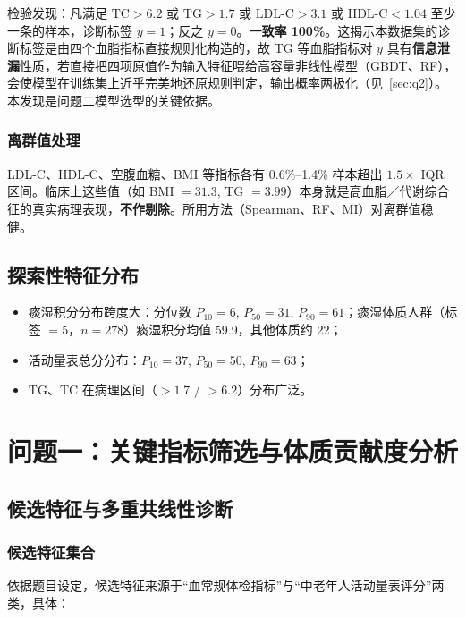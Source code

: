 \documentclass{MathorCupmodeling}
\providecommand{\tightlist}{%
  \setlength{\itemsep}{0pt}\setlength{\parskip}{0pt}}
\begin{document}
检验发现：凡满足 $\text{TC}>6.2$ 或 $\text{TG}>1.7$ 或 $\text{LDL-C}>3.1$ 或 $\text{HDL-C}<1.04$ 至少一条的样本，诊断标签 $y=1$；反之 $y=0$。\textbf{一致率 100\%}。这揭示本数据集的诊断标签是由四个血脂指标直接规则化构造的，故 TG 等血脂指标对 $y$ 具有\textbf{信息泄漏}性质，若直接把四项原值作为输入特征喂给高容量非线性模型（GBDT、RF），会使模型在训练集上近乎完美地还原规则判定，输出概率两极化（见~\cref{sec:q2}）。本发现是问题二模型选型的关键依据。

\subsubsection{离群值处理}

LDL-C、HDL-C、空腹血糖、BMI 等指标各有 0.6\%--1.4\% 样本超出 $1.5\times$ IQR 区间。临床上这些值（如 BMI $=31.3$, TG $=3.99$）本身就是高血脂／代谢综合征的真实病理表现，\textbf{不作剔除}。所用方法（Spearman、RF、MI）对离群值稳健。

\subsection{探索性特征分布}

\begin{itemize}
\tightlist
\item 痰湿积分分布跨度大：分位数 $P_{10}=6$, $P_{50}=31$, $P_{90}=61$；痰湿体质人群（标签 $=5$，$n=278$）痰湿积分均值 59.9，其他体质约 22；
\item 活动量表总分分布：$P_{10}=37$, $P_{50}=50$, $P_{90}=63$；
\item TG、TC 在病理区间（$>1.7$ / $>6.2$）分布广泛。
\end{itemize}

\section{问题一：关键指标筛选与体质贡献度分析}\label{sec:q1}

\subsection{候选特征与多重共线性诊断}

\subsubsection{候选特征集合}

依据题目设定，候选特征来源于``血常规体检指标''与``中老年人活动量表评分''两类，具体：
\end{document}
